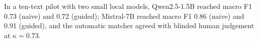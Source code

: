In a ten-text pilot with two small local models, Qwen2.5-1.5B reached macro F1 0.73 (naive) and 0.72 (guided); Mistral-7B reached macro F1 0.86 (naive) and 0.91 (guided), and the automatic matcher agreed with blinded human judgement at $\kappa=0.73$.%
